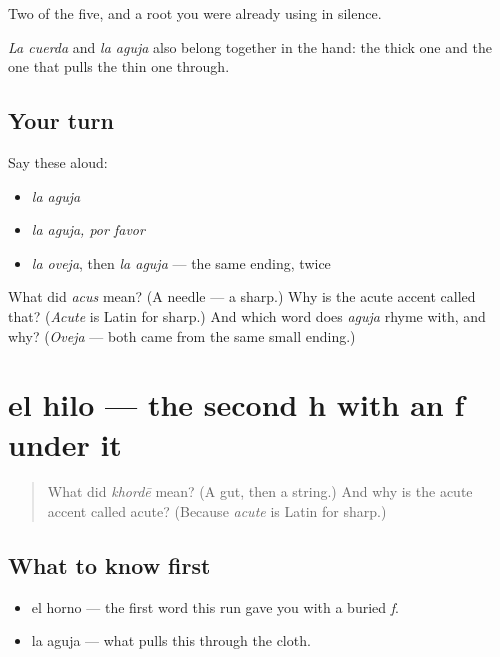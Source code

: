 \begin{grammarlens}[title={What you've built}]
Two of the five, and a root you were already using in silence.

\emph{La cuerda} and \emph{la aguja} also belong together in the hand: the thick one and the one that pulls the thin one through.
\end{grammarlens}

\subsection*{Your turn}
Say these aloud:

\begin{itemize}
\raggedright
  \item \emph{la aguja}
  \item \emph{la aguja, por favor}
  \item \emph{la oveja}, then \emph{la aguja} — the same ending, twice
\end{itemize}

\begin{tcolorbox}[breakable,colback=teal!4,colframe=teal!35!black,title={Before you move on}]
What did \emph{acus} mean? (A needle — a sharp.) Why is the acute accent called that? (\emph{Acute} is Latin for sharp.) And which word does \emph{aguja} rhyme with, and why? (\emph{Oveja} — both came from the same small ending.)
\end{tcolorbox}
\section[el hilo]{el hilo — the second h with an f under it}

\label{lesson:ES-C301-hilo}



\begin{quote}
What did \emph{khordē} mean? (A gut, then a string.) And why is the acute accent called acute? (Because \emph{acute} is Latin for sharp.)
\end{quote}

\subsection*{What to know first}
\begin{itemize}
\raggedright
  \item el horno — the first word this run gave you with a buried \emph{f}.
  \item la aguja — what pulls this through the cloth.
\end{itemize}

